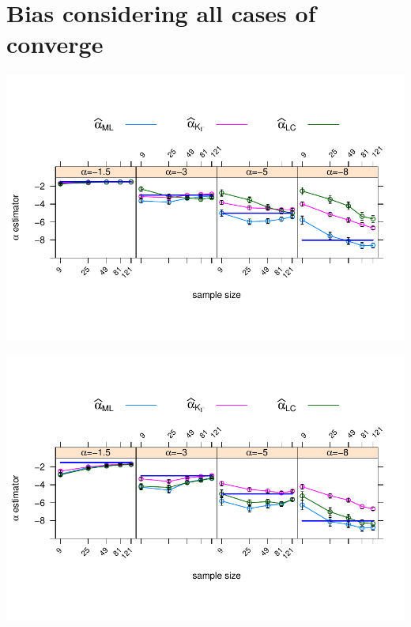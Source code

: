 \documentclass[10pt,a4paper]{article}
\begin{document}
\newpage
\section{Bias considering all cases of converge}

\vspace{1cm}

\begin{minipage}{0.5\linewidth}
\includegraphics[width=\linewidth]{../../../Figures/OtroPaper/ConGeneraGIAlfaGamma/alfa500_sinmenos20NoCont_MVyNG1yLC_MetAntbarrasdeerror_L3.pdf}
\end{minipage}	
\;	
\begin{minipage}{0.5\linewidth}	
\includegraphics[width=\linewidth]{../../../Figures/OtroPaper/ConGeneraGIAlfaGamma/alfa500_sinmenos20NoCont_MVyNG1yLC_gamma10barrasdeerror_L3.pdf}
\end{minipage}	
\end{document}
